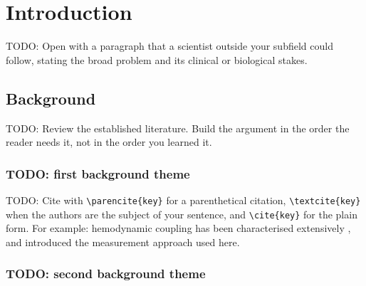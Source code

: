\chapter{Introduction}\label{chapter:introduction}
\thispagestyle{myheadings}


	TODO: Open with a paragraph that a scientist outside your subfield could
	follow, stating the broad problem and its clinical or biological stakes.

	\section{Background}\label{section:introduction:background}

		TODO: Review the established literature. Build the argument in the
		order the reader needs it, not in the order you learned it.

		\subsection{TODO: first background theme}

			TODO: Cite with \verb|\parencite{key}| for a parenthetical
			citation, \verb|\textcite{key}| when the authors are the subject
			of your sentence, and \verb|\cite{key}| for the plain form. For
			example: hemodynamic coupling has been characterised extensively
			\parencite{placeholder-review}, and \textcite{placeholder-methods}
			introduced the measurement approach used here.

		\subsection{TODO: second background theme}


